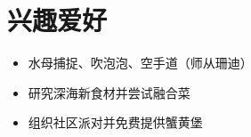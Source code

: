 \section{兴趣爱好}
\begin{itemize}
  \item 水母捕捉、吹泡泡、空手道（师从珊迪）
  \item 研究深海新食材并尝试融合菜
  \item 组织社区派对并免费提供蟹黄堡
\end{itemize}


